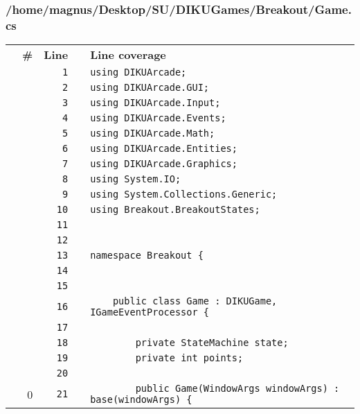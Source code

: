 \documentclass[a4paper,landscape,10pt]{article}
\begin{document}
\subsubsection{/home/magnus/Desktop/SU/DIKUGames/Breakout/Game.cs}
\begin{longtable}[l]{lrrll}
\textbf{} & \textbf{\#} & \textbf{Line} & \textbf{} & \textbf{Line coverage}\\
\cellcolor{gray} &  & \verb~1~ & & \verb~using DIKUArcade;~\\
\cellcolor{gray} &  & \verb~2~ & & \verb~using DIKUArcade.GUI;~\\
\cellcolor{gray} &  & \verb~3~ & & \verb~using DIKUArcade.Input;~\\
\cellcolor{gray} &  & \verb~4~ & & \verb~using DIKUArcade.Events;~\\
\cellcolor{gray} &  & \verb~5~ & & \verb~using DIKUArcade.Math;~\\
\cellcolor{gray} &  & \verb~6~ & & \verb~using DIKUArcade.Entities;~\\
\cellcolor{gray} &  & \verb~7~ & & \verb~using DIKUArcade.Graphics;~\\
\cellcolor{gray} &  & \verb~8~ & & \verb~using System.IO;~\\
\cellcolor{gray} &  & \verb~9~ & & \verb~using System.Collections.Generic;~\\
\cellcolor{gray} &  & \verb~10~ & & \verb~using Breakout.BreakoutStates;~\\
\cellcolor{gray} &  & \verb~11~ & & \verb~~\\
\cellcolor{gray} &  & \verb~12~ & & \verb~~\\
\cellcolor{gray} &  & \verb~13~ & & \verb~namespace Breakout {~\\
\cellcolor{gray} &  & \verb~14~ & & \verb~~\\
\cellcolor{gray} &  & \verb~15~ & & \verb~~\\
\cellcolor{gray} &  & \verb~16~ & & \verb~    public class Game : DIKUGame, IGameEventProcessor {~\\
\cellcolor{gray} &  & \verb~17~ & & \verb~~\\
\cellcolor{gray} &  & \verb~18~ & & \verb~        private StateMachine state;~\\
\cellcolor{gray} &  & \verb~19~ & & \verb~        private int points;~\\
\cellcolor{gray} &  & \verb~20~ & & \verb~~\\
\cellcolor{red} & 0 & \verb~21~ & & \verb~        public Game(WindowArgs windowArgs) : base(windowArgs) {~\\

\end{longtable}
\end{document}
